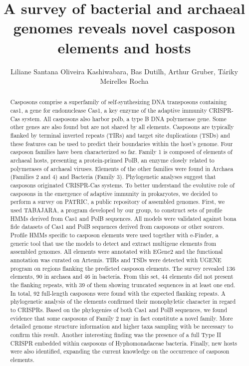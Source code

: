 \documentclass[twoside]{article}
\title{\vspace{-15mm}\fontsize{24pt}{10pt}\selectfont\textbf{ A survey of bacterial and archaeal genomes reveals novel casposon elements and hosts }} %
\author{ Liliane Santana Oliveira Kashiwabara,  Bas Dutilh,  Arthur Gruber,  T\'ariky Meirelles Rocha }
\affil{ UNIVERSIDADE TECNOL\'OGICA FEDERAL DO PARAN\'A,  UNIVERSIDADE DE S\~AO PAULO }
\date{}
\begin{document}
  
  
  \maketitle %
  
  
  \thispagestyle{fancy} %
  
  
  \begin{abstract}
  Casposons comprise a superfamily of self-synthesizing DNA transposons containing cas1,  a gene for endonuclease Cas1,  a key enzyme of the adaptive immunity CRISPR-Cas system. All casposons also harbor polb,  a type B DNA polymerase gene. Some other genes are also found but are not shared by all elements. Casposons are typically flanked by terminal inverted repeats (TIRs) and target site duplications (TSDs) and these features can be used to predict their boundaries within the host’s genome. Four casposon families have been characterized so far. Family 1 is composed of elements of archaeal hosts,  presenting a protein-primed PolB,  an enzyme closely related to polymerases of archaeal viruses. Elements of the other families were found in Archaea (Families 2 and 4) and Bacteria (Family 3). Phylogenetic analyses suggest that casposons originated CRISPR-Cas systems. To better understand the evolutive role of casposons in the emergence of adaptive immunity in prokaryotes,  we decided to perform a survey on PATRIC,  a public repository of assembled genomes. First,  we used TABAJARA,  a program developed by our group,  to construct sets of profile HMMs derived from Cas1 and PolB sequences. All models were validated against bona fide datasets of Cas1 and PolB sequences derived from casposons or other sources. Profile HMMs specific to casposon elements were used together with e-Finder,  a generic tool that use the models to detect and extract multigene elements from assembled genomes. All elements were annotated with EGene2 and the functional annotation was curated on Artemis. TIRs and TSDs were detected with UGENE program on regions flanking the predicted casposon elements. The survey revealed 136 elements,  90 in archaea and 46 in bacteria. From this set,  44 elements did not present the flanking repeats,  with 39 of them showing truncated sequences in at least one end. In total,  92 full-length casposons were found with the expected flanking repeats. A phylogenetic analysis of the elements confirmed their monophyletic character in regard to CRISPRs. Based on the phylogenies of both Cas1 and PolB sequences,  we found evidence that some casposons of Family 2 may in fact constitute a novel family. More detailed genome structure information and higher taxa sampling with be necessary to confirm this result. Another interesting finding was the presence of a full Type II CRISPR embedded within casposons of Hyphomonadaceae bacteria. Finally,  new hosts were also identified,  expanding the current knowledge on the occurrence of casposon elements.
  

\end{abstract}
\end{document}
